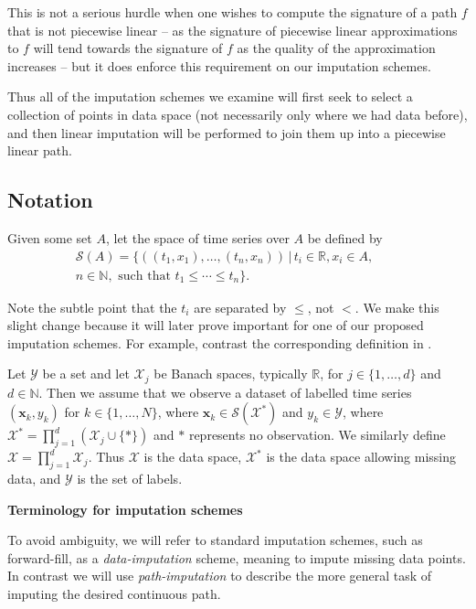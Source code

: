 \documentclass{article}
\renewcommand{\subsubsection}[1]{\textbf{#1}

} %
\newcommand{\reals}{\mathbb{R}}
\newcommand{\naturals}{\mathbb{N}}
\newcommand{\dataspace}{\mathcal{X}}
\newcommand{\lspace}{\mathcal{Y}}
\newcommand{\seriesspace}{\mathcal{S}}
\begin{document}
This is not a serious hurdle when one wishes to compute the signature of a path $f$ that is not piecewise linear -- as the signature of piecewise linear approximations to $f$ will tend towards the signature of $f$ as the quality of the approximation increases \citep{TODO} -- but it does enforce this requirement on our imputation schemes.

Thus all of the imputation schemes we examine will first seek to select a collection of points in data space (not necessarily only where we had data before), and then linear imputation will be performed to join them up into a piecewise linear path.

\subsection{Notation}
Given some set $A$, let the space of time series over $A$ be defined by
\begin{align*}
    \seriesspace(A) = \{((t_1, x_1), \ldots, (t_n, x_n)) \,\vert\, t_i \in \reals, x_i \in A,\qquad \\
    n \in \naturals, \text{ such that } t_1 \leq \cdots \leq t_n\}.
\end{align*}

Note the subtle point that the $t_i$ are separated by $\leq$, not $<$. We make this slight change because it will later prove important for one of our proposed imputation schemes. For example, contrast the corresponding definition in \citep[Section 1]{toth2019gp}.

Let $\lspace$ be a set and let $\dataspace_j$ be Banach spaces, typically $\reals$, for $j \in \{1, \ldots, d\}$ and $d \in \naturals$. Then we assume that we observe a dataset of labelled time series $(\mathbf{x}_k, y_k)$ for $k \in \{1, \ldots, N\}$, where $\mathbf{x}_k \in \seriesspace(\dataspace^*)$ and $y_k \in \lspace$, where $\dataspace^* = \prod_{j = 1}^d(\dataspace_j \cup \{*\})$ and $*$ represents no observation. We similarly define
$\dataspace = \prod_{j = 1}^d\dataspace_j.$ Thus $\dataspace$ is the data space, $\dataspace^*$ is the data space allowing missing data, and $\lspace$ is the set of labels.

\subsubsection{Terminology for imputation schemes}
To avoid ambiguity, we will refer to standard imputation schemes, such as forward-fill, as a \emph{data-imputation} scheme, meaning to impute missing data points. In contrast we will use \emph{path-imputation} to describe the more general task of imputing the desired continuous path.
\end{document}
